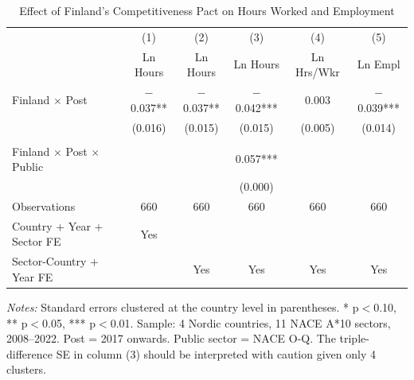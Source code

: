 \begin{table}[H]
\centering
\caption{Effect of Finland's Competitiveness Pact on Hours Worked and Employment}
\label{tab:main}
\small
\begin{threeparttable}
\begin{tabular}{lccccc}
\toprule
& (1) & (2) & (3) & (4) & (5) \\
& Ln Hours & Ln Hours & Ln Hours & Ln Hrs/Wkr & Ln Empl \\
\midrule
Finland $\times$ Post & $-$0.037** & $-$0.037** & $-$0.042*** & 0.003 & $-$0.039*** \\
& (0.016) & (0.015) & (0.015) & (0.005) & (0.014) \\
\\
Finland $\times$ Post $\times$ Public & & & 0.057*** & & \\
& & & (0.000) & & \\
\midrule
Observations & 660 & 660 & 660 & 660 & 660 \\
Country + Year + Sector FE & Yes & & & & \\
Sector-Country + Year FE & & Yes & Yes & Yes & Yes \\
\bottomrule
\end{tabular}
\begin{tablenotes}[flushleft]
\footnotesize
\item \textit{Notes:} Standard errors clustered at the country level in parentheses. * p$<$0.10, ** p$<$0.05, *** p$<$0.01. Sample: 4 Nordic countries, 11 NACE A*10 sectors, 2008--2022. Post = 2017 onwards. Public sector = NACE O-Q. The triple-difference SE in column (3) should be interpreted with caution given only 4 clusters.
\end{tablenotes}
\end{threeparttable}
\end{table}

